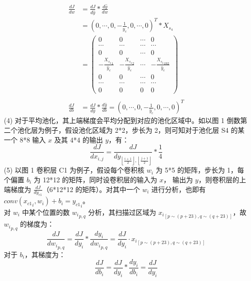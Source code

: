 \documentclass{article}
\begin{document}
	\begin{equation}
	\begin{aligned}
		\frac{dJ}{dw} 
		&= \frac{dJ}{d\hat{y}} * \frac{d\hat{y}}{dw} \\
		&= (0, \cdots, 0, -\frac{1}{\hat{y}_c}, 0, \cdots, 0)^T * X_{s_4} \\
		&= \begin{pmatrix}
			0 & 0 & \cdots & 0 \\ 
			\cdots & \cdots & \cdots & \cdots \\
			0 & 0 & \cdots & 0 \\ 
			-\frac{{X_{s_4}}_{1}}{\hat{y}_c} & -\frac{{X_{s_4}}_{2}}{\hat{y}_c} & \cdots & -\frac{{X_{s_4}}_{192}}{\hat{y}_c}\\
			0 & 0 & \cdots & 0 \\ 
			\cdots & \cdots & \cdots & \cdots \\
			0 & 0 & 0 & 0
			\end{pmatrix} \\ \\
		\frac{dJ}{db}
		&= \frac{dJ}{d\hat{y}} * \frac{d\hat{y}}{db} = (0, \cdots, 0, -\frac{1}{\hat{y}_c}, 0, \cdots, 0)^T
	\end{aligned}
	\end{equation}
	(4) 对于平均池化，其上端梯度会平均分配到对应的池化区域中。如以图 1 倒数第二个池化层为例子，假设池化区域为 2*2，步长为 2，则可知对于池化层 S4 的某一个 8*8 输入 $x$ 及其 4*4 的输出 $y$，有：
	\begin{equation}
		\frac{dJ}{dx_{i,j}} = \frac{dJ}{dy_{\left \lfloor \frac{i+1}{2} \right \rfloor, \left \lfloor \frac{j+1}{2} \right \rfloor}} * \frac{1}{4}
	\end{equation}
	(5) 以图 1 卷积层 C1 为例子，假设每个卷积核 $w_i$ 为 5*5 的矩阵，步长为 1，每个偏置 $b_i$ 为 12*12 的矩阵，同时设卷积层的输入为 $x$， 输出为 $y$，则卷积层的上端梯度为 $\frac{dJ}{dy_{c1}}$（6*12*12 的矩阵）。对其中一个 $w_i$ 进行分析，也即有 $conv({x_{c1}}_i, w_i) + b_i = {y_{c1}}_i$。\\
	对 $w_i$ 中某个位置的数 ${w_i}_{p,q}$ 分析，其扫描过区域为 ${x_i}_{[p\sim(p+23), q\sim(q+23)]}$，故 ${w_i}_{p,q}$ 的梯度为：
	\begin{equation}
		\frac{dJ}{d{w_i}_{p,q}}	= \frac{dJ}{dy_i} * \frac{dy_i}{d{w_i}_{p,q}} = \frac{dJ}{dy_i} · {x_i}_{[p\sim(p+23), q\sim(q+23)]}
	\end{equation}
	对于 $b_i$，其梯度为：
	\begin{equation}
		\frac{dJ}{db_i} = \frac{dJ}{dy_i} * \frac{dy_i}{db_i} = \frac{dJ}{dy_i}
	\end{equation}
\end{document}
